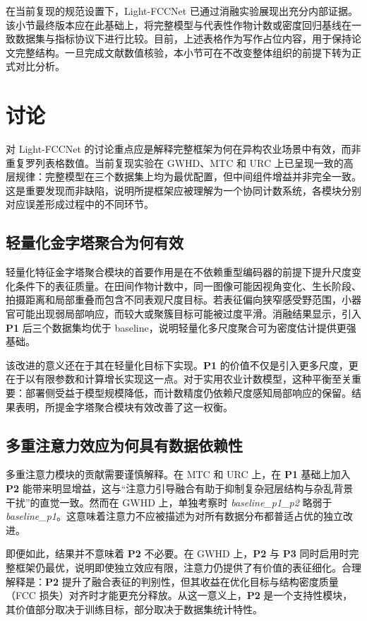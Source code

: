 \documentclass[a4paper,fleqn]{cas-sc}
\begin{document}
在当前复现的规范设置下，Light-FCCNet 已通过消融实验展现出充分内部证据。该小节最终版本应在此基础上，将完整模型与代表性作物计数或密度回归基线在一致数据集与指标协议下进行比较。目前，上述表格作为写作占位内容，用于保持论文完整结构。一旦完成文献数值核验，本小节可在不改变整体组织的前提下转为正式对比分析。

\section{讨论}

对 Light-FCCNet 的讨论重点应是解释完整框架为何在异构农业场景中有效，而非重复罗列表格数值。当前复现实验在 GWHD、MTC 和 URC 上已呈现一致的高层规律：完整模型在三个数据集上均为最优配置，但中间组件增益并非完全一致。这是重要发现而非缺陷，说明所提框架应被理解为一个协同计数系统，各模块分别对应误差形成过程中的不同环节。

\subsection{轻量化金字塔聚合为何有效}

轻量化特征金字塔聚合模块的首要作用是在不依赖重型编码器的前提下提升尺度变化条件下的表征质量。在田间作物计数中，同一图像可能因视角变化、生长阶段、拍摄距离和局部重叠而包含不同表观尺度目标。若表征偏向狭窄感受野范围，小器官可能出现弱局部响应，而较大或聚簇目标可能被过度平滑。消融结果显示，引入 \textbf{P1} 后三个数据集均优于 baseline，说明轻量化多尺度聚合可为密度估计提供更强基础。

该改进的意义还在于其在轻量化目标下实现。\textbf{P1} 的价值不仅是引入更多尺度，更在于以有限参数和计算增长实现这一点。对于实用农业计数模型，这种平衡至关重要：部署侧受益于模型规模降低，而计数精度仍依赖尺度感知局部响应的保留。结果表明，所提金字塔聚合模块有效改善了这一权衡。

\subsection{多重注意力效应为何具有数据依赖性}

多重注意力模块的贡献需要谨慎解释。在 MTC 和 URC 上，在 \textbf{P1} 基础上加入 \textbf{P2} 能带来明显增益，这与“注意力引导融合有助于抑制复杂冠层结构与杂乱背景干扰”的直觉一致。然而在 GWHD 上，单独考察时 \textit{baseline\_p1\_p2} 略弱于 \textit{baseline\_p1}。这意味着注意力不应被描述为对所有数据分布都普适占优的独立改进。

即便如此，结果并不意味着 \textbf{P2} 不必要。在 GWHD 上，\textbf{P2} 与 \textbf{P3} 同时启用时完整框架仍最优，说明即使独立效应有限，注意力仍提供了有价值的表征细化。合理解释是：\textbf{P2} 提升了融合表征的判别性，但其收益在优化目标与结构密度质量（FCC 损失）对齐时才能更充分释放。从这一意义上，\textbf{P2} 是一个支持性模块，其价值部分取决于训练目标，部分取决于数据集统计特性。
\end{document}
